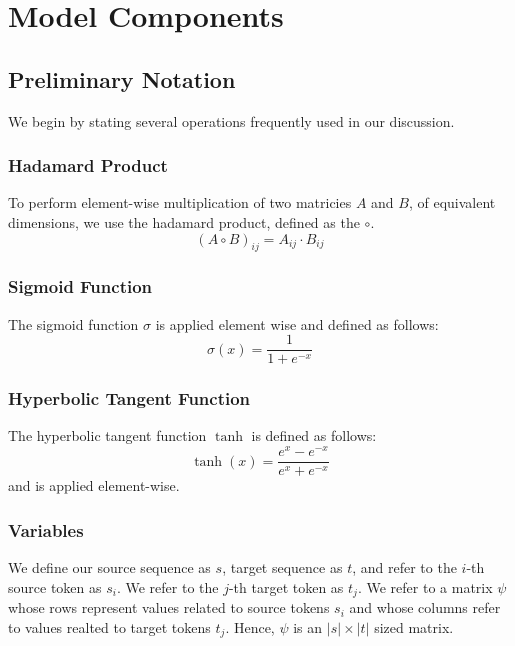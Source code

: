 \documentclass[twoside,twocolumn]{article}
\begin{document}
\section{Model Components}
\subsection{Preliminary Notation}
We begin by stating several operations frequently used in our discussion.

\subsubsection{Hadamard Product}

To perform element-wise multiplication of two matricies $A$ and $B$, of
equivalent dimensions, we use the hadamard product, defined as the $\circ$.
\begin{equation}
  (A \circ B)_{ij} = A_{ij} \cdot B_{ij}
\end{equation}

\subsubsection{Sigmoid Function}

The sigmoid function $\sigma$ is applied element wise and defined as follows:
\begin{equation}
  \sigma(x) = \frac{1}{1+e^{-x}}
\end{equation}

\subsubsection{Hyperbolic Tangent Function}

The hyperbolic tangent function $\tanh$ is defined as follows:
\begin{equation}
  \tanh(x) = \frac{e^x - e^{-x}} {e^x + e^{-x}}
\end{equation}
and is applied element-wise.

\subsubsection{Variables}
We define our source sequence as $s$, target sequence as $t$, and refer to
the $i$-th source token as $s_i$. We refer to the $j$-th target token as $t_j$.
We refer to a matrix $\psi$ whose rows represent values related to source
tokens $s_i$ and whose columns refer to values realted to target tokens $t_j$.
Hence, $\psi$ is an $|s| \times |t|$ sized matrix.
\end{document}
